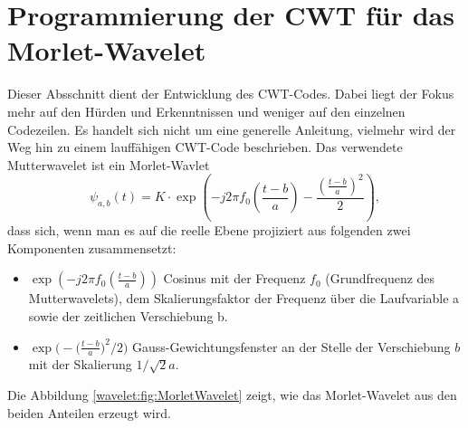 %
%
%
%
\section{Programmierung der CWT für das Morlet-Wavelet 
\label{wavelets:section:teil2}}

Dieser Absschnitt dient der Entwicklung des CWT-Codes.
Dabei liegt der Fokus mehr auf den Hürden und Erkenntnissen und
weniger auf den einzelnen Codezeilen.
Es handelt sich nicht um eine generelle Anleitung, vielmehr wird
der Weg hin zu einem lauffähigen CWT-Code beschrieben.
Das verwendete Mutterwavelet ist ein Morlet-Wavlet \cite{wavelets:Wikipedia}
\begin{equation}
	\psi_{a,b}(t)=K\cdot\exp\left(-j2\pi f_0\left(\frac{t-b}{a}\right)-\frac{\left(\frac{t-b}{a}\right)^2}{2}\right),
	\label{wavelets:equation6}
\end{equation}
dass sich, wenn man es auf die reelle Ebene projiziert aus folgenden
zwei Komponenten zusammensetzt:

\begin{itemize}
	\item $\exp\left(-j2\pi f_0\left(\frac{t-b}{a}\right)\right)$
	Cosinus mit der Frequenz $f_0$ (Grundfrequenz des
	Mutterwavelets), dem Skalierungsfaktor der Frequenz über
	die Laufvariable a sowie der zeitlichen Verschiebung b.
	\item $\exp\bigl(-\bigl(\frac{t-b}{a}\bigr)^2/2\bigr)$
	Gauss-Gewichtungsfenster an der Stelle der Verschiebung $b$
	mit der Skalierung $1/\!\sqrt{2}a$.
\end{itemize}
Die Abbildung \ref{wavelet:fig:MorletWavelet} zeigt, wie das
Morlet-Wavelet aus den beiden Anteilen erzeugt wird.

